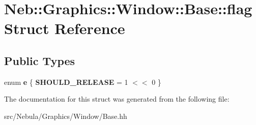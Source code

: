 \hypertarget{structNeb_1_1Graphics_1_1Window_1_1Base_1_1flag}{\section{\-Neb\-:\-:\-Graphics\-:\-:\-Window\-:\-:\-Base\-:\-:flag \-Struct \-Reference}
\label{structNeb_1_1Graphics_1_1Window_1_1Base_1_1flag}
}
\subsection*{\-Public \-Types}
\begin{DoxyCompactItemize}
\item 
enum {\bfseries e} \{ {\bfseries \-S\-H\-O\-U\-L\-D\-\_\-\-R\-E\-L\-E\-A\-S\-E} =  1 $<$$<$ 0
 \}
\end{DoxyCompactItemize}


\-The documentation for this struct was generated from the following file\-:\begin{DoxyCompactItemize}
\item 
src/\-Nebula/\-Graphics/\-Window/\-Base.\-hh\end{DoxyCompactItemize}

